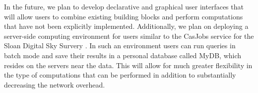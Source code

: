 \documentclass{sig-alternate}
\begin{document}
In the future, we plan to develop
declarative and graphical user interfaces that will allow users to combine existing building blocks and perform computations that have not been explicitly
implemented. Additionally, we plan on deploying a server-side computing environment for users similar to the CasJobs service for the Sloan Digital Sky Survery \cite{LiThakar}. In such an environment users can run queries in batch mode and save their results in a personal database called MyDB, which 
resides on the servers near the data.
This will allow for much greater flexibility in the type of computations that can be performed in addition to substantially decreasing the network overhead.





\end{document}
